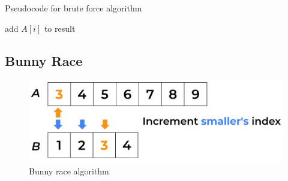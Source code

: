 \begin{algorithm}
    \captionsetup{labelsep=newline}
    \caption{Pseudocode for brute force algorithm \label{alg:bruteforce}}
    \begin{algorithmic}[1]
                    \State add $A[i]$ to result
                \EndIf
            \EndFor
        \EndFor
    \end{algorithmic}
\end{algorithm}

\subsection{Bunny Race \label{sec:bunnyrace}}

\begin{figure}[H] 
    \begin{center}
        \includegraphics[width=.8\textwidth]{imgs/bunny_search.png}
        \caption{Bunny race algorithm \label{fig:bunnyrace}}
    \end{center}
\end{figure}

